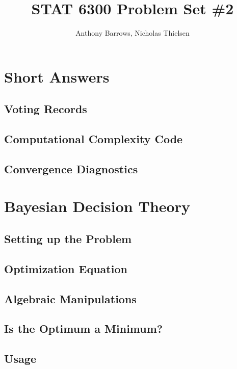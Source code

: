 \documentclass[]{article}
\title{STAT 6300 Problem Set \#2}
\author{Anthony Barrows, Nicholas Thielsen}
\begin{document}
\maketitle


\section{Short Answers}

\subsection{Voting Records}


\subsection{Computational Complexity Code}


\subsection{Convergence Diagnostics}

\section{Bayesian Decision Theory}

\subsection{Setting up the Problem}


\subsection{Optimization Equation}


\subsection{Algebraic Manipulations}


\subsection{Is the Optimum a Minimum?}


\subsection{Usage}

\end{document}
